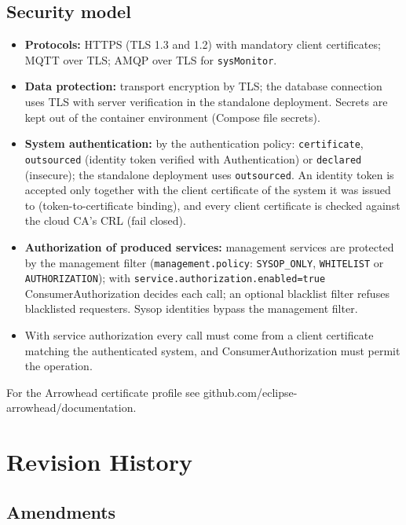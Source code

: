 \documentclass[a4paper]{arrowhead}
\begin{document}
\subsection{Security model}


\begin{itemize}
  \item \textbf{Protocols:} HTTPS (TLS 1.3 and 1.2) with mandatory client certificates; MQTT over TLS; AMQP over TLS for \texttt{sysMonitor}.
  \item \textbf{Data protection:} transport encryption by TLS; the database connection uses TLS with server verification in the standalone deployment. Secrets are kept out of the container environment (Compose file secrets).
  \item \textbf{System authentication:} by the authentication policy: \texttt{certificate}, \texttt{outsourced} (identity token verified with Authentication) or \texttt{declared} (insecure); the standalone deployment uses \texttt{outsourced}. An identity token is accepted only together with the client certificate of the system it was issued to (token-to-certificate binding), and every client certificate is checked against the cloud CA's CRL (fail closed).
  \item \textbf{Authorization of produced services:} management services are protected by the management filter (\texttt{management.policy}: \texttt{SYSOP\_ONLY}, \texttt{WHITELIST} or \texttt{AUTHORIZATION}); with \texttt{service.authorization.enabled=true} ConsumerAuthorization decides each call; an optional blacklist filter refuses blacklisted requesters. Sysop identities bypass the management filter.
  \item With service authorization every call must come from a client certificate matching the authenticated system, and Consumer\allowbreak{}Authorization must permit the operation.
\end{itemize}

For the Arrowhead certificate profile see github.com/eclipse-arrowhead/documentation.





\newpage

\section{Revision History}
\subsection{Amendments}
\end{document}
